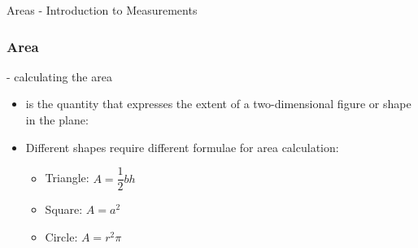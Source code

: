 \begin{omgroup}{Areas - Introduction to Measurements}
\begin{module}[id=area]
\begin{frame}
  \frametitle{Area}
  - calculating the area\\
      \begin{itemize}
      \item
      \begin{definition}[id=area.def]
         is the quantity that expresses the extent of a two-dimensional figure or shape in the plane:
      \end{definition}
    \end{itemize}
\begin{itemize}
\item Different shapes require different formulae for area calculation:
  	\begin{itemize}
  	\item Triangle: $A = \dfrac{1}{2}bh$
  	\item Square: $A = a^2$
    \item Circle: $A = r^2\pi$
	\end{itemize}
\end{itemize}
\end{frame}
\end{module}
\end{omgroup}
